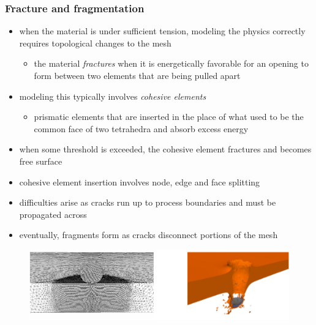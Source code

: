 \begin{frame}[fragile]
%
  \frametitle{Fracture and fragmentation}
%
  \begin{itemize}
%
  \item when the material is under sufficient tension, modeling the physics correctly
    requires topological changes to the mesh
    \begin{itemize}
    \item the material {\em fractures} when it is energetically favorable for an opening to
      form between two elements that are being pulled apart
    \end{itemize}
%
  \item modeling this typically involves {\em cohesive elements}
    \begin{itemize}
    \item prismatic elements that are inserted in the place of what used to be the common face
      of two tetrahedra and absorb excess energy
    \end{itemize}
%
  \item when some threshold is exceeded, the cohesive element fractures and becomes free
    surface
%
  \item cohesive element insertion involves node, edge and face splitting
  \item difficulties arise as cracks run up to process boundaries and must be propagated across
  \item eventually, fragments form as cracks disconnect portions of the mesh
%
  \end{itemize}
%
  \begin{figure}
    \includegraphics[scale=0.5]{figures/mesh-penetration.pdf}
  \end{figure}
%
\end{frame}

